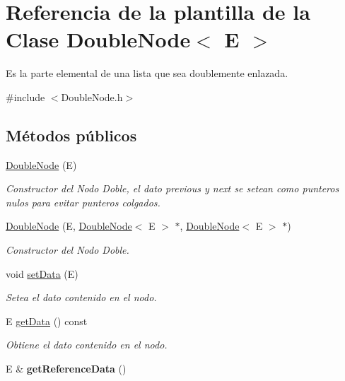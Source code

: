 \hypertarget{classDoubleNode}{\section{Referencia de la plantilla de la Clase Double\-Node$<$ E $>$}
\label{classDoubleNode}
}


Es la parte elemental de una lista que sea doublemente enlazada.  




{\ttfamily \#include $<$Double\-Node.\-h$>$}

\subsection*{Métodos públicos}
\begin{DoxyCompactItemize}
\item 
\hyperlink{classDoubleNode_a915ac8a626f09ec53db64b7c5b294b2d}{Double\-Node} (E)
\begin{DoxyCompactList}\small\item\em Constructor del Nodo Doble, el dato previous y next se setean como punteros nulos para evitar punteros colgados. \end{DoxyCompactList}\item 
\hyperlink{classDoubleNode_a53d29dbf397d39b420f64ab943b62cee}{Double\-Node} (E, \hyperlink{classDoubleNode}{Double\-Node}$<$ E $>$ $\ast$, \hyperlink{classDoubleNode}{Double\-Node}$<$ E $>$ $\ast$)
\begin{DoxyCompactList}\small\item\em Constructor del Nodo Doble. \end{DoxyCompactList}\item 
void \hyperlink{classDoubleNode_a21f86a81b7d4e4db966e07ce06da4f3a}{set\-Data} (E)
\begin{DoxyCompactList}\small\item\em Setea el dato contenido en el nodo. \end{DoxyCompactList}\item 
E \hyperlink{classDoubleNode_a59310f31d21f431febc4d329e1f10699}{get\-Data} () const 
\begin{DoxyCompactList}\small\item\em Obtiene el dato contenido en el nodo. \end{DoxyCompactList}\item 
\hypertarget{classDoubleNode_ac6b096a9a3a404f73e26b7319372fcbb}{E \& {\bfseries get\-Reference\-Data} ()}\label{classDoubleNode_ac6b096a9a3a404f73e26b7319372fcbb}


\end{DoxyCompactItemize}
